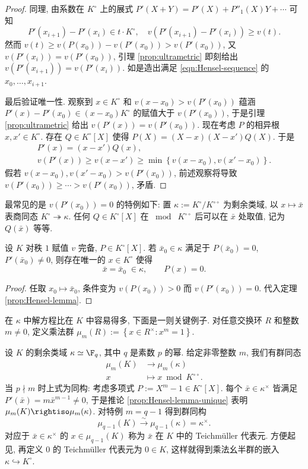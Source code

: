 \begin{proof}
	同理, 由系数在 $K^\circ$ 上的展式 $P'(X+Y) = P'(X) + P''_1(X) Y + \cdots$ 可知
	\[ P'(x_{i+1}) - P'(x_i) \in  t \cdot K^\circ, \quad v(P'(x_{i+1}) - P'(x_i)) \geq v(t). \]
	然而 $v(t) \geq v(P(x_0)) - v(P'(x_0)) > v(P'(x_0))$, 又 $v(P'(x_i)) = v(P'(x_0))$, 引理 \ref{prop:ultrametric} 即刻给出 $v(P'(x_{i+1})) = v(P'(x_i))$. 如是造出满足 \eqref{eqn:Hensel-sequence} 的 $x_0, \ldots, x_{i+1}$.
	
	最后验证唯一性. 观察到 $x \in K^\circ$ 和 $v(x-x_0) > v(P'(x_0))$ 蕴涵 $P'(x) - P'(x_0) \in (x-x_0) K^\circ$ 的赋值大于 $v(P'(x_0))$, 于是引理 \ref{prop:ultrametric} 给出 $v(P'(x)) = v(P'(x_0))$. 现在考虑 $P$ 的相异根 $x, x' \in K^\circ$. 存在 $Q \in K^\circ[X]$ 使得 $P(X) = (X-x)(X-x') Q(X)$. 于是
	\begin{gather*}
		P'(x) = (x-x')Q(x), \\
		v(P'(x)) \geq v(x-x') \geq \min\left\{ v(x - x_0), v(x' - x_0) \right\}.
	\end{gather*}
	假若 $v(x-x_0), v(x'-x_0) > v(P'(x_0))$, 前述观察将导致 $v(P'(x_0)) \geq \cdots > v(P'(x_0))$, 矛盾.
\end{proof}

最常见的是 $v(P'(x_0))=0$ 的特例如下: 置 $\kappa := K^\circ/K^{\circ\circ}$ 为剩余类域, 以 $x \mapsto \bar{x}$ 表商同态 $K^\circ \twoheadrightarrow \kappa$. 任何 $Q \in K^\circ[X]$ 在 $\bmod \; K^{\circ\circ}$ 后可以在 $\bar{x}$ 处取值, 记为 $Q(\bar{x})$ 等等.
\begin{corollary}\label{prop:Hensel-lemma-unique}
	设 $K$ 对秩 $1$ 赋值 $v$ 完备, $P \in K^\circ[X]$. 若 $\bar{x}_0 \in \kappa$ 满足于 $P(\bar{x}_0) = 0$, $P'(\bar{x}_0) \neq 0$, 则存在唯一的 $x \in K^\circ$ 使得
	\[ \bar{x} = \bar{x}_0 \;\in \kappa, \qquad P(x)=0. \]
\end{corollary}
\begin{proof}
	任取 $x_0 \mapsto \bar{x}_0$, 条件变为 $v(P(x_0)) > 0$ 而 $v(P'(x_0))=0$. 代入定理 \ref{prop:Hensel-lemma}.
\end{proof}

在 $\kappa$ 中解方程比在 $K$ 中容易得多, 下面是一则关键例子. 对任意交换环 $R$ 和整数 $m \neq 0$, 定义乘法群 $\mu_m(R) := \left\{ x \in R^\times: x^m = 1 \right\}$.

\begin{example}\label{eg:Teichmuller-rep}
	设 $K$ 的剩余类域 $\kappa \simeq \F_q$, 其中 $q$ 是素数 $p$ 的幂. 给定非零整数 $m$, 我们有群同态
	\begin{align*}
		\mu_m(K) & \longrightarrow \mu_m(\kappa) \\
		x & \longmapsto x \bmod K^{\circ\circ}.
	\end{align*}
	当 $p \nmid m$ 时上式为同构: 考虑多项式 $P := X^m - 1 \in K^\circ[X]$. 每个 $\bar{x} \in \kappa^\times$ 皆满足 $P'(\bar{x}) = m\bar{x}^{m-1} \neq 0$, 于是推论 \ref{prop:Hensel-lemma-unique} 表明 $\mu_m(K) \rightiso \mu_m(\kappa)$. 对特例 $m = q-1$ 得到群同构
	\[ \mu_{q-1}(K) \stackrel{\sim}{\longrightarrow} \mu_{q-1}(\kappa) = \kappa^\times. \]
	对应于 $\bar{x} \in \kappa^\times$ 的 $x \in \mu_{q-1}(K)$ 称为 $\bar{x}$ 在 $K$ 中的 Teichmüller 代表元. 方便起见, 再定义 $0$ 的 Teichmüller 代表元为 $0 \in K$, 这样就得到乘法幺半群的嵌入 $\kappa \hookrightarrow K^\circ$.
\end{example}

